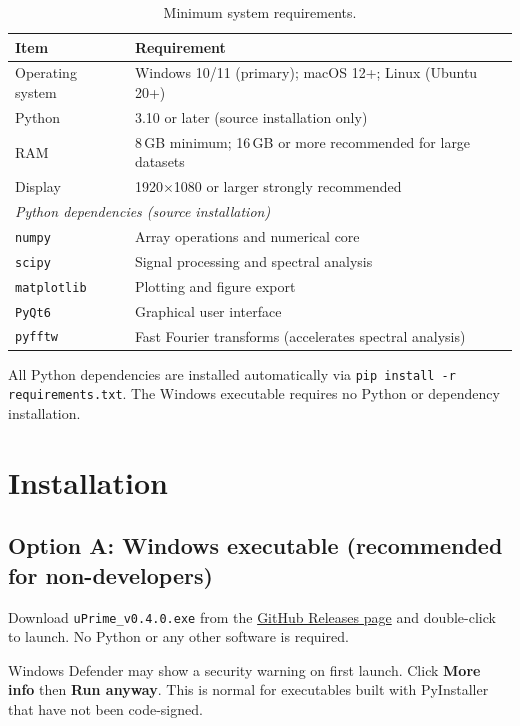 \documentclass[11pt, a4paper]{report}
\begin{document}
\begin{table}[htbp]
\centering
\caption{Minimum system requirements.}
\begin{tabular}{ll}
\toprule
\textbf{Item} & \textbf{Requirement} \\
\midrule
Operating system  & Windows 10/11 (primary); macOS 12+; Linux (Ubuntu 20+) \\
Python            & 3.10 or later (source installation only) \\
RAM               & 8\,GB minimum; 16\,GB or more recommended for large datasets \\
Display           & 1920$\times$1080 or larger strongly recommended \\
\midrule
\multicolumn{2}{l}{\textit{Python dependencies (source installation)}} \\
\midrule
\texttt{numpy}      & Array operations and numerical core \\
\texttt{scipy}      & Signal processing and spectral analysis \\
\texttt{matplotlib} & Plotting and figure export \\
\texttt{PyQt6}      & Graphical user interface \\
\texttt{pyfftw}     & Fast Fourier transforms (accelerates spectral analysis) \\
\bottomrule
\end{tabular}
\end{table}

\begin{notebox}
All Python dependencies are installed automatically via \texttt{pip install -r requirements.txt}. The Windows executable requires no Python or dependency installation.
\end{notebox}

\section{Installation}

\subsection{Option A: Windows executable (recommended for non-developers)}

Download \texttt{uPrime\_v0.4.0.exe} from the
\href{https://github.com/CmdrRyder/uPrime/releases}{GitHub Releases page}
and double-click to launch. No Python or any other software is required.

\begin{notebox}
Windows Defender may show a security warning on first launch. Click \textbf{More info} then \textbf{Run anyway}. This is normal for executables built with PyInstaller that have not been code-signed.
\end{notebox}
\end{document}
